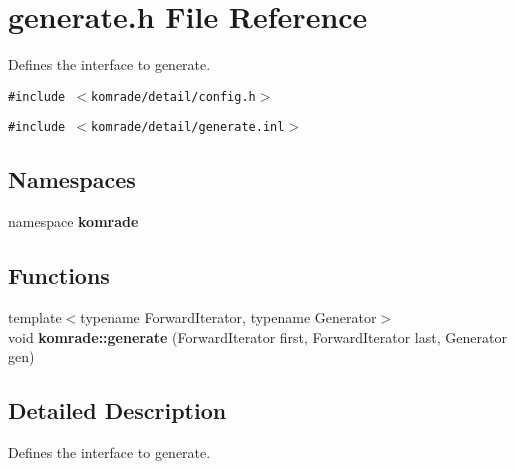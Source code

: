 \section{generate.h File Reference}
\label{generate_8h}
Defines the interface to generate. 

{\tt \#include $<$komrade/detail/config.h$>$}\par
{\tt \#include $<$komrade/detail/generate.inl$>$}\par
\subsection*{Namespaces}
\begin{CompactItemize}
\item 
namespace {\bf komrade}
\end{CompactItemize}
\subsection*{Functions}
\begin{CompactItemize}
\item 
{\footnotesize template$<$typename ForwardIterator, typename Generator$>$ }\\void {\bf komrade::generate} (ForwardIterator first, ForwardIterator last, Generator gen)
\end{CompactItemize}


\subsection{Detailed Description}
Defines the interface to generate. 

